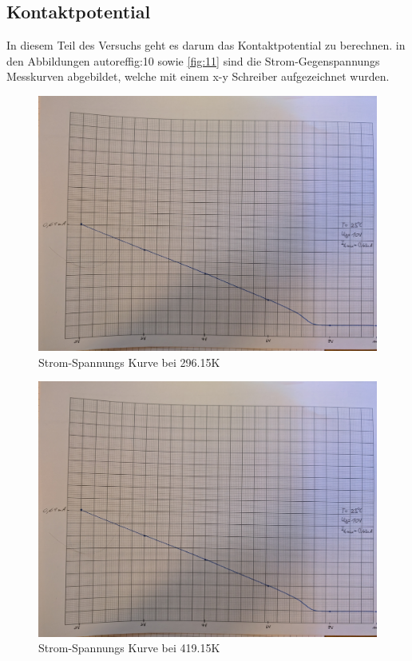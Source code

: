 \subsection{Kontaktpotential}
In diesem Teil des Versuchs geht es darum das Kontaktpotential zu berechnen. 
in den Abbildungen {autoref{fig:10}} sowie \autoref{fig:11} sind die Strom-Gegenspannungs Messkurven
abgebildet, welche mit einem x-y Schreiber aufgezeichnet wurden.
\begin{figure}[H]
  \centering
  \includegraphics[width=\linewidth]{Bilder/1.jpg}
  \caption{Strom-Spannungs Kurve bei 296.15\unit{\kelvin}}
  \label{fig:10}
\end{figure}

\begin{figure}[H]
  \centering
  \includegraphics[width=\linewidth]{Bilder/1.jpg}
  \caption{Strom-Spannungs Kurve bei 419.15\unit{\kelvin}}
  \label{fig:11}
\end{figure}

